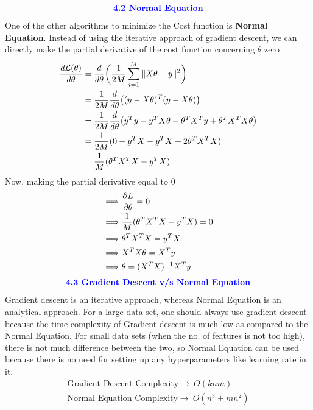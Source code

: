 \documentclass{homework}
\begin{document}
\begin{align*}
    \textcolor{blue}{\text{{\textbf{4.2 Normal Equation}}}}
\end{align*}
One of the other algorithms to minimize the Cost function is\textbf{ Normal Equation}. Instead of using the iterative approach of gradient descent, we can directly make the partial derivative of the cost function concerning $\theta$ zero\\
\begin{align*}
{\frac{d\mathcal{L(\theta)}}{ d\theta}} &= {d \over d\theta}\bigg(\frac{1}{2M}\displaystyle\sum^{M}_{i = 1}\|X\theta - y\|^2\bigg)\\&={1\over 2M}{d \over d\theta}\big((y-X\theta)^T(y-X\theta)\big)\\ &= {1\over 2M}{d \over d\theta}\big(y^Ty-y^TX\theta - \theta^TX^Ty + \theta^TX^TX\theta\big)\\ &={1\over 2M}( 0-y^TX-y^TX+2\theta^TX^TX)\\ &= {1\over M}(\theta^TX^TX-y^TX)
\end{align*}
Now, making the partial derivative equal to 0
\begin{align*}
    \implies& {\partial L \over \partial \theta} = 0 \\ 
     \implies&  {1\over M}(\theta^TX^TX-y^TX) = 0\\
     \implies&  \theta^TX^TX = y^TX\\
     \implies& X^TX\theta = X^Ty\\
     \implies& \theta = (X^TX)^{-1}X^Ty
\end{align*}
\begin{align*}
    \textcolor{blue}{\text{{\textbf{4.3 Gradient Descent v/s Normal Equation}}}}
\end{align*}
Gradient descent is an iterative approach, whereas Normal Equation is an analytical approach. For a large data set, one should always use gradient descent because the time complexity of Gradient descent is much low as compared to the Normal Equation. For small data sets (when the no. of features is not too high), there is not much difference between the two, so Normal Equation can be used because there is no need for setting up any hyperparameters like learning rate in it.
\begin{align*}
\text{Gradient Descent Complexity} \longrightarrow \ O(knm)\\
\text{Normal Equation Complexity} \longrightarrow \ O(n^3+mn^2)
\end{align*}
\end{document}
